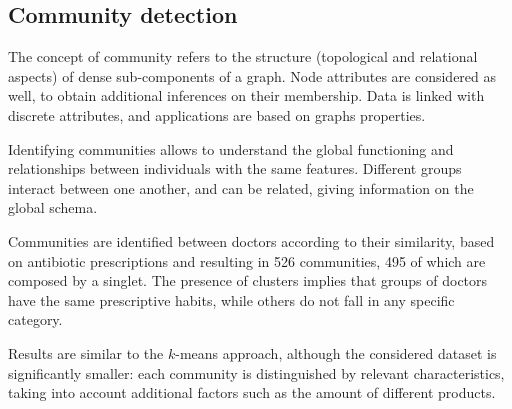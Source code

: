 \subsection{Community detection}
The concept of community refers to the structure (topological and relational aspects) of dense sub-components of a graph. Node attributes are considered as well, to obtain additional inferences on their membership. Data is linked with discrete attributes, and applications are based on graphs properties.

Identifying communities allows to understand the global functioning and relationships between individuals with the same features. Different groups interact between one another, and can be related, giving information on the global schema.

Communities are identified between doctors according to their similarity, based on antibiotic prescriptions and resulting in 526 communities, 495 of which are composed by a singlet. The presence of clusters implies that groups of doctors have the same prescriptive habits, while others do not fall in any specific category.

Results are similar to the $k$-means approach, although the considered dataset is significantly smaller: each community is distinguished by relevant characteristics, taking into account additional factors such as the amount of different products.


